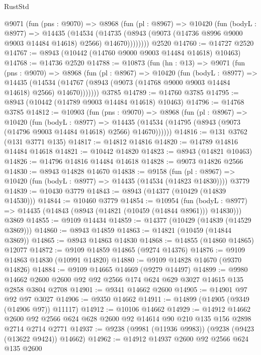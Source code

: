 \begin{lexlean}{RustStd}
\begin{coremodule}
      @9071
        (fun (pns : @9070) =>
        @8968
          (fun (pl : @8967) =>
          @10420
            (fun (bodyL : @8977) =>
            @14435
              (@14534
                (@14735 (@8943 (@9073 (@14736 @8996 @9000 @9003 @14484 @14618) @2566) @14670))))))))
    @2520
@14760 := @14727 @2520
@14767 := @8943 (@10442 (@14760 @9000 @9003 @14484 @14618) @10463)
@14768 := @14736 @2520
@14788 := @10873
    (fun (hn : @13) =>
    @9071
      (fun (pns : @9070) =>
      @8968
        (fun (pl : @8967) =>
        @10420
          (fun (bodyL : @8977) =>
          @14435
            (@14534 (@14767 (@8943 (@9073 (@14768 @9000 @9003 @14484 @14618) @2566) @14670)))))))
    @3785
@14789 := @14760 @3785
@14795 := @8943 (@10442 (@14789 @9003 @14484 @14618) @10463)
@14796 := @14768 @3785
@14812 := @10903
    (fun (pns : @9070) =>
    @8968
      (fun (pl : @8967) =>
      @10420
        (fun (bodyL : @8977) =>
        @14435 (@14534 (@14795 (@8943 (@9073 (@14796 @9003 @14484 @14618) @2566) @14670))))))
@14816 := @131 @3762 (@131 @3771 @135)
@14817 := @14812 @14816
@14820 := @14789 @14816 @14484 @14618
@14821 := @10442 @14820
@14823 := @8943 (@14821 @10463)
@14826 := @14796 @14816 @14484 @14618
@14828 := @9073 @14826 @2566
@14830 := @8943 @14828 @14670
@14838 := @9158
    (fun (pl : @8967) => @10420 (fun (bodyL : @8977) => @14435 (@14534 (@14823 @14830))))
    @3779
@14839 := @10430 @3779
@14843 := @8943 (@14377 (@10429 (@14839 @14530)))
@14844 := @10460 @3779
@14854 := @10954
    (fun (bodyL : @8977) => @14435 (@14843 (@8943 (@14821 (@10459 (@14844 @8961))) @14830)))
    @3869
@14855 := @9109 @14434
@14859 := @14377 (@10429 (@14839 (@14529 @3869)))
@14860 := @8943 @14859
@14863 := @14821 (@10459 (@14844 @3869))
@14865 := @8943 @14863 @14830
@14868 := @14855 (@14860 @14865) @12077
@14872 := @9109 @14859 @14865 (@9274 @14376)
@14876 := @9109 @14863 @14830 (@10991 @14820)
@14880 := @9109 @14828 @14670 (@9370 @14826)
@14884 := @9109 @14665 @14669 (@9279 @14497)
@14899 := @9980 @14662 @2600 @2600 @92 @92 @2566 @174 @624 @629 @3027 @14615 @135 @2858 @3804 @2708
@14901 := @9341 @14662 @2600
@14905 := @14901 @97 @92 @97 @3027
@14906 := @9350 @14662
@14911 := @14899 (@14905 (@9349 (@14906 @97)) @11117)
@14912 := @10106 @14662
@14929 := @14912
    @14662
    @2600
    @92
    @2566
    @624
    @628
    @2600
    @92
    @14614
    @90
    @210
    @135
    @156
    @2898
    @2714
    @2714
    @2771
@14937 := @9238 (@9981 (@11936 @9983)) (@9238 (@9423 (@13622 @9424)) @14662)
@14962 := @14912
    @14937
    @2600
    @92
    @2566
    @624
    @135
    @2600

\end{coremodule}
\end{lexlean}
